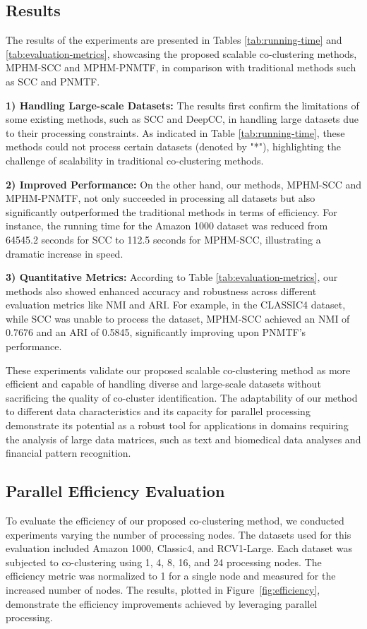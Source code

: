 \documentclass[journal]{IEEEtran}
\begin{document}
\subsection{Results}
The results of the experiments are presented in Tables \ref{tab:running-time} and \ref{tab:evaluation-metrics}, showcasing the proposed scalable co-clustering methods, MPHM-SCC and MPHM-PNMTF, in comparison with traditional methods such as SCC and PNMTF.

\textbf{1) Handling Large-scale Datasets:} The results first confirm the limitations of some existing methods, such as SCC and DeepCC, in handling large datasets due to their processing constraints. As indicated in Table \ref{tab:running-time}, these methods could not process certain datasets (denoted by "*"), highlighting the challenge of scalability in traditional co-clustering methods.

\textbf{2) Improved Performance:} On the other hand, our methods, MPHM-SCC and MPHM-PNMTF, not only succeeded in processing all datasets but also significantly outperformed the traditional methods in terms of efficiency. For instance, the running time for the Amazon 1000 dataset was reduced from 64545.2 seconds for SCC to 112.5 seconds for MPHM-SCC, illustrating a dramatic increase in speed.

\textbf{3) Quantitative Metrics:} According to Table \ref{tab:evaluation-metrics}, our methods also showed enhanced accuracy and robustness across different evaluation metrics like NMI and ARI. For example, in the CLASSIC4 dataset, while SCC was unable to process the dataset, MPHM-SCC achieved an NMI of 0.7676 and an ARI of 0.5845, significantly improving upon PNMTF's performance.

These experiments validate our proposed scalable co-clustering method as more efficient and capable of handling diverse and large-scale datasets without sacrificing the quality of co-cluster identification. The adaptability of our method to different data characteristics and its capacity for parallel processing demonstrate its potential as a robust tool for applications in domains requiring the analysis of large data matrices, such as text and biomedical data analyses and financial pattern recognition.

\subsection{Parallel Efficiency Evaluation}
To evaluate the efficiency of our proposed co-clustering method, we conducted experiments varying the number of processing nodes. The datasets used for this evaluation included Amazon 1000, Classic4, and RCV1-Large. Each dataset was subjected to co-clustering using 1, 4, 8, 16, and 24 processing nodes. The efficiency metric was normalized to 1 for a single node and measured for the increased number of nodes. The results, plotted in Figure~\ref{fig:efficiency}, demonstrate the efficiency improvements achieved by leveraging parallel processing.
\end{document}
